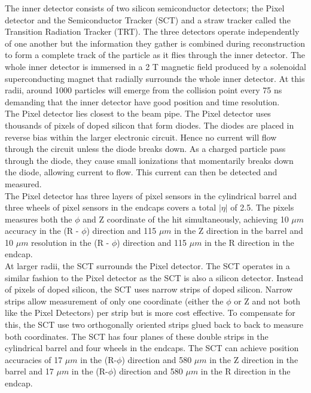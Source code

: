 \indent The inner detector consists of two silicon semiconductor detectors; the Pixel detector and the Semiconductor Tracker (SCT) and a straw tracker called the Transition Radiation Tracker (TRT). The three detectors operate independently of one another but the information they gather is combined during reconstruction to form a complete track of the particle as it flies through the inner detector. The whole inner detector is immersed in a 2 T magnetic field produced by a solenoidal superconducting magnet that radially surrounds the whole inner detector. At this radii, around 1000 particles will emerge from the collision point every 75 ns demanding that the inner detector have good position and time resolution. \cite{biblio:JINST} ~\\ 
\indent The Pixel detector lies closest to the beam pipe. The Pixel detector uses thousands of pixels of doped silicon that form diodes. The diodes are placed in reverse bias within the larger electronic circuit. Hence no current will flow through the circuit unless the diode breaks down. As a charged particle pass through the diode, they cause small ionizations that momentarily breaks down the diode, allowing current to flow. This current can then be detected and measured. ~\\
\indent The Pixel detector has three layers of pixel sensors in the cylindrical barrel and three wheels of pixel sensors in the endcaps covers a total $|\eta|$ of 2.5. The pixels measures both the $\phi$ and Z coordinate of the hit simultaneously, achieving 10 ${\mu}m$ accuracy in the (R - $\phi$) direction and 115 ${\mu}m$ in the Z direction in the barrel and 10 ${\mu}m$ resolution in the (R - $\phi$) direction and 115 ${\mu}m$ in the R direction in the endcap. \cite{biblio:JINST} ~\\
\indent At larger radii, the SCT surrounds the Pixel detector. The SCT operates in a similar fashion to the Pixel detector as the SCT is also a silicon detector. Instead of pixels of doped silicon, the SCT uses narrow strips of doped silicon. Narrow strips allow measurement of only one coordinate (either the $\phi$ or Z and not both like the Pixel Detectors) per strip but is more cost effective. To compensate for this, the SCT use two orthogonally oriented strips glued back to back to measure both coordinates. The SCT has four planes of these double strips in the cylindrical barrel and four wheels in the endcaps. The SCT can achieve position accuracies of 17 ${\mu}m$ in the (R-$\phi$) direction and 580 ${\mu}m$ in the Z direction in the barrel and 17 ${\mu}m$ in the (R-$\phi$) direction and 580 ${\mu}m$ in the R direction in the endcap. \cite{biblio:JINST} ~\\
